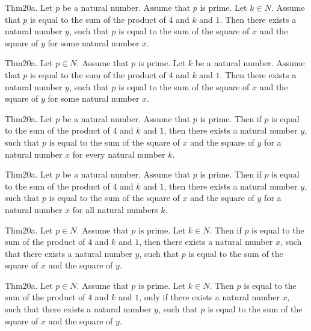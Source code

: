 \documentclass{article}
\begin{document}
Thm20a. Let $p$ be a natural number. Assume that $p$ is prime. Let $k \in N$. Assume that $p$ is equal to the sum of the product of $4$ and $k$ and $1$. Then there exists a natural number $y$, such that $p$ is equal to the sum of the square of $x$ and the square of $y$ for some natural number $x$.

Thm20a. Let $p \in N$. Assume that $p$ is prime. Let $k$ be a natural number. Assume that $p$ is equal to the sum of the product of $4$ and $k$ and $1$. Then there exists a natural number $y$, such that $p$ is equal to the sum of the square of $x$ and the square of $y$ for some natural number $x$.

Thm20a. Let $p$ be a natural number. Assume that $p$ is prime. Then if $p$ is equal to the sum of the product of $4$ and $k$ and $1$, then there exists a natural number $y$, such that $p$ is equal to the sum of the square of $x$ and the square of $y$ for a natural number $x$ for every natural number $k$.

Thm20a. Let $p$ be a natural number. Assume that $p$ is prime. Then if $p$ is equal to the sum of the product of $4$ and $k$ and $1$, then there exists a natural number $y$, such that $p$ is equal to the sum of the square of $x$ and the square of $y$ for a natural number $x$ for all natural numbers $k$.

Thm20a. Let $p \in N$. Assume that $p$ is prime. Let $k \in N$. Then if $p$ is equal to the sum of the product of $4$ and $k$ and $1$, then there exists a natural number $x$, such that there exists a natural number $y$, such that $p$ is equal to the sum of the square of $x$ and the square of $y$.

Thm20a. Let $p \in N$. Assume that $p$ is prime. Let $k \in N$. Then $p$ is equal to the sum of the product of $4$ and $k$ and $1$, only if there exists a natural number $x$, such that there exists a natural number $y$, such that $p$ is equal to the sum of the square of $x$ and the square of $y$.
\end{document}
